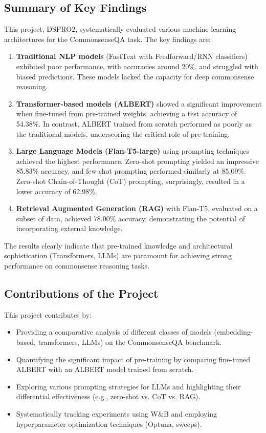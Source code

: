 \documentclass[10.5pt]{article}
\begin{document}
\subsection{Summary of Key Findings}
This project, DSPRO2, systematically evaluated various machine learning architectures for the CommonsenseQA task. The key findings are:
\begin{enumerate}
    \item \textbf{Traditional NLP models} (FastText with Feedforward/RNN classifiers) exhibited poor performance, with accuracies around 20\%, and struggled with biased predictions. These models lacked the capacity for deep commonsense reasoning.
    \item \textbf{Transformer-based models (ALBERT)} showed a significant improvement when fine-tuned from pre-trained weights, achieving a test accuracy of 54.38\%. In contrast, ALBERT trained from scratch performed as poorly as the traditional models, underscoring the critical role of pre-training.
    \item \textbf{Large Language Models (Flan-T5-large)} using prompting techniques achieved the highest performance. Zero-shot prompting yielded an impressive 85.83\% accuracy, and few-shot prompting performed similarly at 85.09\%. Zero-shot Chain-of-Thought (CoT) prompting, surprisingly, resulted in a lower accuracy of 62.98\%.
    \item \textbf{Retrieval Augmented Generation (RAG)} with Flan-T5, evaluated on a subset of data, achieved 78.00\% accuracy, demonstrating the potential of incorporating external knowledge.
\end{enumerate}
The results clearly indicate that pre-trained knowledge and architectural sophistication (Transformers, LLMs) are paramount for achieving strong performance on commonsense reasoning tasks.

\subsection{Contributions of the Project}
This project contributes by:
\begin{itemize}
    \item Providing a comparative analysis of different classes of models (embedding-based, transformers, LLMs) on the CommonsenseQA benchmark.
    \item Quantifying the significant impact of pre-training by comparing fine-tuned ALBERT with an ALBERT model trained from scratch.
    \item Exploring various prompting strategies for LLMs and highlighting their differential effectiveness (e.g., zero-shot vs. CoT vs. RAG).
    \item Systematically tracking experiments using W\&B and employing hyperparameter optimization techniques (Optuna, sweeps).
\end{itemize}
\end{document}

